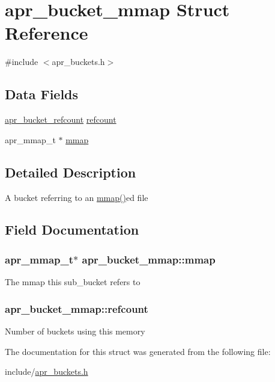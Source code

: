 \hypertarget{structapr__bucket__mmap}{\section{apr\-\_\-bucket\-\_\-mmap Struct Reference}
\label{structapr__bucket__mmap}
}


{\ttfamily \#include $<$apr\-\_\-buckets.\-h$>$}

\subsection*{Data Fields}
\begin{DoxyCompactItemize}
\item 
\hyperlink{structapr__bucket__refcount}{apr\-\_\-bucket\-\_\-refcount} \hyperlink{structapr__bucket__mmap_a99f201622002479f4f84ea10598a013c}{refcount}
\item 
apr\-\_\-mmap\-\_\-t $\ast$ \hyperlink{structapr__bucket__mmap_a66e9385752aaacb7fef7e96db62f1920}{mmap}
\end{DoxyCompactItemize}


\subsection{Detailed Description}
A bucket referring to an \hyperlink{structapr__bucket__mmap_a66e9385752aaacb7fef7e96db62f1920}{mmap()}ed file 

\subsection{Field Documentation}
\hypertarget{structapr__bucket__mmap_a66e9385752aaacb7fef7e96db62f1920}{
\subsubsection[{mmap}]{\setlength{\rightskip}{0pt plus 5cm}apr\-\_\-mmap\-\_\-t$\ast$ apr\-\_\-bucket\-\_\-mmap\-::mmap}}\label{structapr__bucket__mmap_a66e9385752aaacb7fef7e96db62f1920}
The mmap this sub\-\_\-bucket refers to \hypertarget{structapr__bucket__mmap_a99f201622002479f4f84ea10598a013c}{
\subsubsection[{refcount}]{ apr\-\_\-bucket\-\_\-mmap\-::refcount}}\label{structapr__bucket__mmap_a99f201622002479f4f84ea10598a013c}
Number of buckets using this memory 

The documentation for this struct was generated from the following file\-:\begin{DoxyCompactItemize}
\item 
include/\hyperlink{apr__buckets_8h}{apr\-\_\-buckets.\-h}\end{DoxyCompactItemize}
